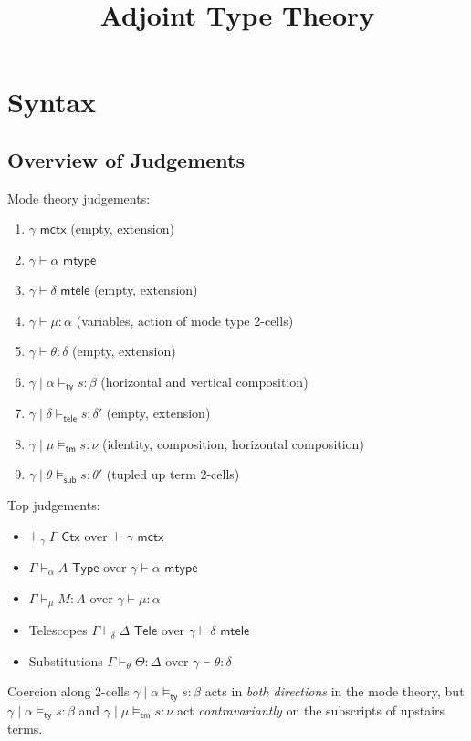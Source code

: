 \documentclass[10pt]{article}
\title{Adjoint Type Theory}
\author{}
\date{}
\newcommand{\yields}{\vdash}
\newcommand{\CTX}{\,\,\mathsf{Ctx}}
\newcommand{\ctx}{\,\,\mathsf{mctx}}
\newcommand{\TYPE}{\,\,\mathsf{Type}}
\newcommand{\type}{\,\,\mathsf{mtype}}
\newcommand{\TELE}{\,\,\mathsf{Tele}}
\newcommand{\tele}{\,\,\mathsf{mtele}}
\newcommand\TypeTwo[4]{\ensuremath{#1 \mid #3 \vDash_\mathsf{ty} #2 : #4}}
\newcommand\TeleTwo[4]{\ensuremath{#1 \mid #3 \vDash_\mathsf{tele} #2 : #4}}
\newcommand\TermTwo[4]{\ensuremath{#1 \mid #3 \vDash_\mathsf{tm} #2 : #4}}
\newcommand\SubTwo[4]{\ensuremath{#1 \mid #3 \vDash_\mathsf{sub} #2 : #4}}
\begin{document}
\maketitle

\section{Syntax}

\subsection{Overview of Judgements}

Mode theory judgements:
\begin{enumerate}
\item $\gamma \ctx$ (empty, extension)
\item $\gamma \yields \alpha \type$ 
\item $\gamma \yields \delta \tele$ (empty, extension)
\item $\gamma \yields \mu : \alpha$ (variables, action of mode type 2-cells)
\item $\gamma \yields \theta : \delta$ (empty, extension)
\item $\TypeTwo{\gamma}{s}{\alpha}{\beta}$ (horizontal and vertical composition)
\item $\TeleTwo{\gamma}{s}{\delta}{\delta'}$ (empty, extension)
\item $\TermTwo{\gamma}{s}{\mu}{\nu}$ (identity,
  composition, horizontal composition)
\item $\SubTwo{\gamma}{s}{\theta}{\theta'}$ (tupled up term 2-cells)
\end{enumerate}
Top judgements: 
\begin{itemize}
\item $\yields_\gamma \Gamma \CTX$ over $\yields \gamma \ctx$
\item $\Gamma \yields_\alpha A \TYPE$ over $\gamma \yields \alpha \type$
\item $\Gamma \yields_\mu M : A$ over $\gamma \yields \mu : \alpha$
\item Telescopes $\Gamma \yields_\delta \Delta \TELE$ over $\gamma \yields \delta \tele$
\item Substitutions $\Gamma \yields_\theta \Theta : \Delta$ over $\gamma \yields \theta : \delta$
\end{itemize}

Coercion along 2-cells $\TypeTwo{\gamma}{s}{\alpha}{\beta}$ acts in \emph{both directions} in the mode theory, but $\TypeTwo{\gamma}{s}{\alpha}{\beta}$ and $\TermTwo{\gamma}{s}{\mu}{\nu}$ act \emph{contravariantly} on the subscripts of upstairs terms.
\end{document}
